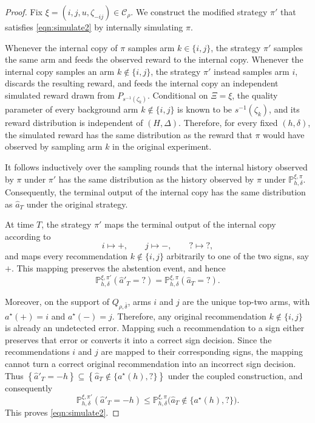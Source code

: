\documentclass[10pt]{article}
\theoremstyle{plain}
\begin{document}
\begin{proof}
Fix $\xi=(i,j,u,\zeta_{-ij})\in\mathcal C_\rho$. We construct the
modified strategy $\pi'$ that satisfies \eqref{eqn:simulate2} by internally simulating $\pi$.

Whenever the internal copy of $\pi$ samples arm $k\in\{i,j\}$, the strategy
$\pi'$ samples the same arm and feeds the observed reward to the internal
copy. Whenever the internal copy samples an arm $k\notin\{i,j\}$, the
strategy $\pi'$ instead samples arm $i$, discards the resulting reward, and
feeds the internal copy an independent simulated reward drawn from $P_{s^{-1}(\zeta_k)}$.
Conditional on $\Xi=\xi$, the quality parameter of every background arm
$k\notin\{i,j\}$ is known to be $s^{-1}(\zeta_k)$, and its reward
distribution is independent of $(H,\Delta)$. Therefore, for every fixed
$(h,\delta)$, the simulated reward has the same distribution as the reward
that $\pi$ would have observed by sampling arm $k$ in the original
experiment.

It follows inductively over the sampling rounds that the internal history
observed by $\pi$ under $\pi'$ has the same distribution as the history
observed by $\pi$ under
$\mathbb P_{h,\delta}^{\xi,\pi}$. Consequently, the terminal output of the
internal copy has the same distribution as $\hat a_T$ under the original
strategy.

At time $T$, the strategy $\pi'$ maps the terminal output of the internal
copy according to
\[
    i\mapsto +,\qquad
    j\mapsto -,\qquad
    ?\mapsto ?,
\]
and maps every recommendation $k\notin\{i,j\}$ arbitrarily to one of the
two signs, say $+$. This mapping preserves the abstention event, and hence
\[
    \mathbb P_{h,\delta}^{\xi,\pi'}(\hat a'_T=?)
    =
    \mathbb P_{h,\delta}^{\xi,\pi}(\hat a_T=?).
\]

Moreover, on the support of $Q_{\rho,\bar\delta}$, arms $i$ and $j$ are
the unique top-two arms, with $a^\star(+)=i$ and $a^\star(-)=j$. Therefore,
any original recommendation $k\notin\{i,j\}$ is already an undetected
error. Mapping such a recommendation to a sign either preserves that error
or converts it into a correct sign decision. Since the recommendations
$i$ and $j$ are mapped to their corresponding signs, the mapping cannot
turn a correct original recommendation into an incorrect sign decision.
Thus
    $\left\{\hat a'_T=-h\right\}
    \subseteq
    \left\{
        \hat a_T\notin\{a^\star(h),?\}
    \right\}$
under the coupled construction, and consequently
\[
    \mathbb P_{h,\delta}^{\xi,\pi'}(\hat a'_T=-h)
    \le
    \mathbb P_{h,\delta}^{\xi,\pi}
    \bigl(\hat a_T\notin\{a^\star(h),?\}\bigr).
\]
This proves \eqref{eqn:simulate2}. 
\end{proof}
\end{document}
